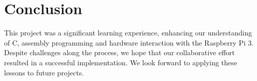 \documentclass[9pt,a4paper,twoside]{tau-class/tau}
\begin{document}
    \section{Conclusion} 
    This project was a significant learning experience, enhancing our understanding of C, assembly programming and hardware interaction with the Raspberry Pi 3. Despite challenges along the process, we hope that our collaborative effort resulted in a successful implementation. We look forward to applying these lessons to future projects. 
\end{document}
